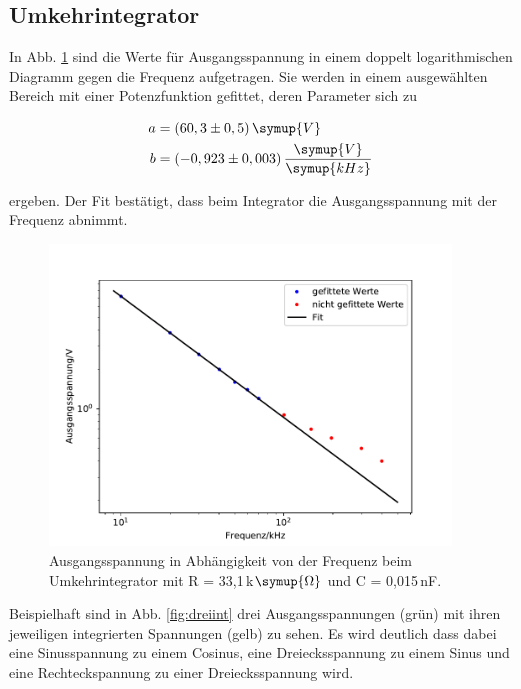         \subsection{Umkehrintegrator}

            In Abb. \ref{fig:int} sind die Werte für Ausgangsspannung in einem doppelt logarithmischen Diagramm 
            gegen die Frequenz aufgetragen. Sie werden in einem ausgewählten Bereich mit einer Potenzfunktion gefittet, 
            deren Parameter sich zu 

            \begin{align*}
                a &= (60,3\pm 0,5)\,\symup{V} \\
                b &= (-0,923\pm 0,003)\,\frac{\symup{V}}{\symup{kHz}} \\
            \end{align*}

            ergeben. Der Fit bestätigt, dass beim Integrator die Ausgangsspannung mit der Frequenz abnimmt.

            \begin{figure}
                \centering
                \includegraphics[height=8cm]{integrator.pdf}
                \caption{Ausgangsspannung in Abhängigkeit von der Frequenz 
                beim Umkehrintegrator mit R = 33,1\,k$\symup{\Omega}$ und C = 0,015\,nF.}
                \label{fig:int}
            \end{figure}

            Beispielhaft sind in Abb. \ref{fig:dreiint} drei Ausgangsspannungen (grün)
            mit ihren jeweiligen integrierten Spannungen (gelb) zu sehen. Es wird deutlich dass dabei 
            eine Sinusspannung zu einem Cosinus, eine Dreiecksspannung zu einem Sinus und eine 
            Rechteckspannung zu einer Dreiecksspannung wird.


